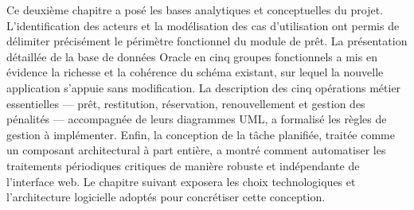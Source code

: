 Ce deuxième chapitre a posé les bases analytiques et conceptuelles du projet.
L'identification des acteurs et la modélisation des cas d'utilisation ont permis
de délimiter précisément le périmètre fonctionnel du module de prêt. La
présentation détaillée de la base de données Oracle en cinq groupes
fonctionnels a mis en évidence la richesse et la cohérence du schéma existant,
sur lequel la nouvelle application s'appuie sans modification. La description
des cinq opérations métier essentielles — prêt, restitution, réservation,
renouvellement et gestion des pénalités — accompagnée de leurs diagrammes UML,
a formalisé les règles de gestion à implémenter. Enfin, la conception de la
tâche planifiée, traitée comme un composant architectural à part entière, a
montré comment automatiser les traitements périodiques critiques de manière
robuste et indépendante de l'interface web. Le chapitre suivant exposera les
choix technologiques et l'architecture logicielle adoptés pour concrétiser
cette conception.